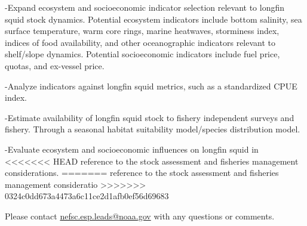 \documentclass[
<<<<<<< HEAD
  8.5pt,
  letterpaper,
]{article}
\begin{document}
\raggedright

-Expand ecosystem and socioeconomic indicator selection relevant to
longfin squid stock dynamics. Potential ecosystem indicators include
bottom salinity, sea surface temperature, warm core rings, marine
heatwaves, storminess index, indices of food availability, and other
oceanographic indicators relevant to shelf/slope dynamics. Potential
socioeconomic indicators include fuel price, quotas, and ex-vessel
price.

\vspace{0.25cm}

-Analyze indicators against longfin squid metrics, such as a
standardized CPUE index.

\vspace{0.25cm}

-Estimate availability of longfin squid stock to fishery independent
surveys and fishery. Through a seasonal habitat suitability
model/species distribution model.

\vspace{0.25cm}

-Evaluate ecosystem and socioeconomic influences on longfin squid in
<<<<<<< HEAD
reference to the stock assessment and fisheries management
considerations.
=======
reference to the stock assessment and fisheries management consideratio
>>>>>>> 0324c0dd673a4473a6c11ce2d1afb0ef56d69683

\vspace{2.0cm}

\centering

Please contact \url{nefsc.esp.leads@noaa.gov} with any questions or
comments.
\end{document}
